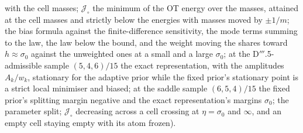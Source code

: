 {with the cell masses; $\mathcal{J}_\circ$ the minimum of the OT energy over the masses, attained at the cell masses
and strictly below the energies with masses moved by $\pm1/m$; the bias formula against the finite-difference
sensitivity, the mode terms summing to the law, the law below the bound, and the weight moving the shares toward
$h\approx\sigma_0$ against the unweighted ones at a small and a large $\sigma_0$; at the D$'''$.5-admissible sample
$(5,4,6)/15$ the exact representation, with the amplitudes $A_k/w_k$, stationary for the adaptive prior while the
fixed prior's stationary point is a strict local minimiser and biased; at the saddle sample $(6,5,4)/15$ the fixed
prior's splitting margin negative and the exact representation's margins $\sigma_0$; the parameter split;
$\mathcal{J}_\circ$ decreasing across a cell crossing at $\eta = \sigma_0$ and $\infty$, and an empty cell staying
empty with its atom frozen).}

